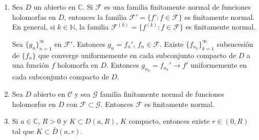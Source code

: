 \begin{remark}
    \hfill
    \begin{enumerate}
        \item Sea $D$ un abierto en $\mathbb{C}$.
              Si $\mathcal{F}$ es una familia finitamente normal de funciones holomorfas en $D$, entonces la familia $\mathcal{F}' = \{f' : f \in \mathcal{F}\}$ es finitamente normal.
              En general, si $k \in \mathbb{N}$, la familia $\mathcal{F}^{(k)} = \{f^{(k)} : f \in \mathcal{F}\}$ es finitamente normal.

              Sea $\{g_n\}_{n=1}^\infty$ en $\mathcal{F}'$.
              Entonces $g_n = f_n'$, $f_n \in \mathcal{F}$.
              Existe $\{f_{n_k}\}_{k=1}^\infty$ subsucesión de $\{f_n\}$ que converge uniformemente en cada subconjunto compacto de $D$ a una función $f$ holomorfa en $D$.
              Entonces $g_{n_k} = f_{n_k}' \to f'$ uniformemente en cada subconjunto compacto de $D$.

        \item Sea $D$ abierto en $\mathcal{C}$ y sea $\mathcal{G}$ familia finitamente normal de funciones holomorfas en $D$ con $\mathcal{F} \subset \mathcal{G}$.
              Entonces $\mathcal{F}$ es finitamente normal.

        \item Si $a \in \mathbb{C}$, $R > 0$ y $K \subset D(a, R)$, $K$ compacto, entonces existe $r \in (0, R)$ tal que $K \subset \overline{D}(a, r)$.
    \end{enumerate}
\end{remark}

